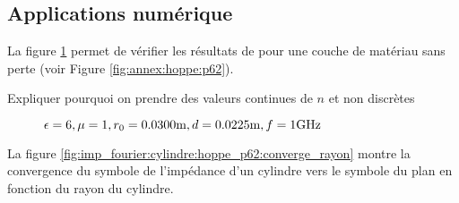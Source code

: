     \subsection{Applications numérique}

        La figure \ref{fig:imp_fourier:cylindre:hoppe_p62} permet de vérifier les résultats de \cite[p.~62]{hoppe_impedance_1995} pour une couche de matériau sans perte (voir Figure \ref{fig:annex:hoppe:p62}).

        \begin{TODO}
          Expliquer pourquoi on prendre des valeurs continues de \(n\) et non discrètes
        \end{TODO}

        \begin{figure}[!hbt]
            \centering
            \caption{\(\epsilon = 6, \mu = 1, r_0 = 0.0300\text{m}, d=0.0225\text{m}, f=1\text{GHz}\)}
            \label{fig:imp_fourier:cylindre:hoppe_p62}
        \end{figure}
        
        La figure \ref{fig:imp_fourier:cylindre:hoppe_p62:converge_rayon} montre la convergence du symbole de l'impédance d'un cylindre vers le symbole du plan en fonction du rayon du cylindre.

